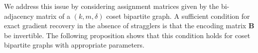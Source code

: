 \documentclass[journal,draftcls,onecolumn]{IEEEtran}
\theoremstyle{mystyle}
\newcommand{\bfB}{\mathbf{B}}
\newcommand{\aditya}[1]{\marginpar{+}{\bf Aditya's remark}: {\em #1}}
\begin{document}

We address this issue by considering assignment matrices given by the
bi-adjacency matrix of a $(k,m,\delta)$ coset bipartite graph.
A sufficient condition for exact gradient recovery in the absence of
stragglers is that the encoding matrix $\bfB$ be invertible.
The following proposition shows that this condition holds for coset
bipartite graphs with appropriate parameters.











\end{document}
